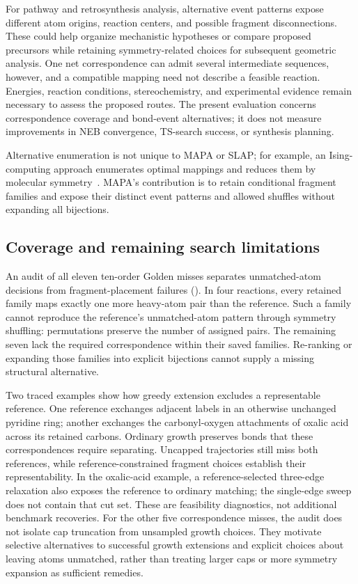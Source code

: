 For pathway and retrosynthesis analysis, alternative event patterns expose different atom origins, reaction centers, and possible fragment disconnections. These could help organize mechanistic hypotheses or compare proposed precursors while retaining symmetry-related choices for subsequent geometric analysis. One net correspondence can admit several intermediate sequences, however, and a compatible mapping need not describe a feasible reaction. Energies, reaction conditions, stereochemistry, and experimental evidence remain necessary to assess the proposed routes. The present evaluation concerns correspondence coverage and bond-event alternatives; it does not measure improvements in NEB convergence, TS-search success, or synthesis planning.

Alternative enumeration is not unique to MAPA or SLAP; for example, an Ising-computing approach enumerates optimal mappings and reduces them by molecular symmetry~\citep{ali2025}. MAPA's contribution is to retain conditional fragment families and expose their distinct event patterns and allowed shuffles without expanding all bijections.

\FloatBarrier
\subsection{Coverage and remaining search limitations}

An audit of all eleven ten-order Golden misses separates unmatched-atom decisions from fragment-placement failures (). In four reactions, every retained family maps exactly one more heavy-atom pair than the reference. Such a family cannot reproduce the reference's unmatched-atom pattern through symmetry shuffling: permutations preserve the number of assigned pairs. The remaining seven lack the required correspondence within their saved families. Re-ranking or expanding those families into explicit bijections cannot supply a missing structural alternative.

Two traced examples show how greedy extension excludes a representable reference. One reference exchanges adjacent labels in an otherwise unchanged pyridine ring; another exchanges the carbonyl-oxygen attachments of oxalic acid across its retained carbons. Ordinary growth preserves bonds that these correspondences require separating. Uncapped trajectories still miss both references, while reference-constrained fragment choices establish their representability. In the oxalic-acid example, a reference-selected three-edge relaxation also exposes the reference to ordinary matching; the single-edge sweep does not contain that cut set. These are feasibility diagnostics, not additional benchmark recoveries. For the other five correspondence misses, the audit does not isolate cap truncation from unsampled growth choices. They motivate selective alternatives to successful growth extensions and explicit choices about leaving atoms unmatched, rather than treating larger caps or more symmetry expansion as sufficient remedies.

